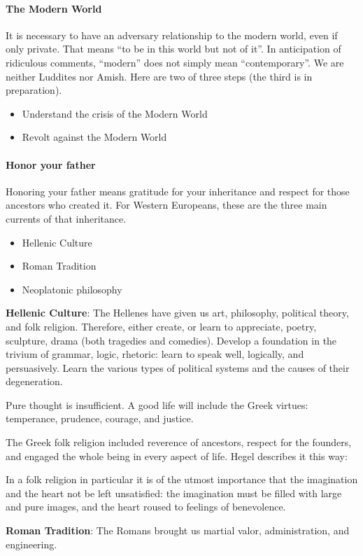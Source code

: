 \paragraph{The Modern World}
It is necessary to have an adversary relationship to the modern world, even if only private. That means “to be in this world but not of it”. In anticipation of ridiculous comments, “modern” does not simply mean “contemporary”. We are neither Luddites nor Amish. Here are two of three steps (the third is in preparation).

\begin{itemize}
\item Understand the crisis of the Modern World 
\item Revolt against the Modern World 
\end{itemize}
\paragraph{Honor your father}
Honoring your father means gratitude for your inheritance and respect for those ancestors who created it. For Western Europeans, these are the three main currents of that inheritance.

\begin{itemize}
\item Hellenic Culture 
\item Roman Tradition 
\item Neoplatonic philosophy 
\end{itemize}
\textbf{Hellenic Culture}: The Hellenes have given us art, philosophy, political theory, and folk religion. Therefore, either create, or learn to appreciate, poetry, sculpture, drama (both tragedies and comedies). Develop a foundation in the trivium of grammar, logic, rhetoric: learn to speak well, logically, and persuasively. Learn the various types of political systems and the causes of their degeneration.

Pure thought is insufficient. A good life will include the Greek virtues: temperance, prudence, courage, and justice.

The Greek folk religion included reverence of ancestors, respect for the founders, and engaged the whole being in every aspect of life. Hegel describes it this way:

\begin{quotex}
In a folk religion in particular it is of the utmost importance that the imagination and the heart not be left unsatisfied: the imagination must be filled with large and pure images, and the heart roused to feelings of benevolence. 

\end{quotex}
\textbf{Roman Tradition}: The Romans brought us martial valor, administration, and engineering.

